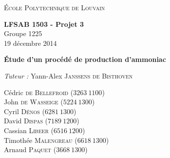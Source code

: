 \begin{titlepage}
    \begin{center}
        \vspace*{1cm}
        
        \Large
	\textsc{École Polytechnique de Louvain} \\
        \vspace{1cm}
	
	\textbf{LFSAB 1503 - Projet 3} \\  

	\large
        Groupe 1225 \\
	19 décembre 2014	
        
        \vspace{3cm}
        
        \Huge
	\textbf{Étude d'un procédé de production d'ammoniac}
        \vspace{0,5cm}
        
        

        \vfill 
        \large

	\begin{flushright}

	\textit{Tuteur : } Yann-Alex \textsc{Janssens de Bisthoven} \vspace{1\baselineskip}

	Cédric \textsc{de Bellefroid}  ($3263~1100$) \\
	John \textsc{de Wasseige}  ($5224~1300$) \\
	Cyril \textsc{Dénos}  ($6281~1300$) \\
	David \textsc{Dispas}  ($7189~1200$) \\
	Cassian \textsc{Libeer}   ($6516~1200$) \\
	Timothée \textsc{Malengreau}  ($6618~1300$) \\
	Arnaud \textsc{Paquet}  ($3668~1300$) \\       
	\end{flushright}
        
    \end{center}
\end{titlepage}
